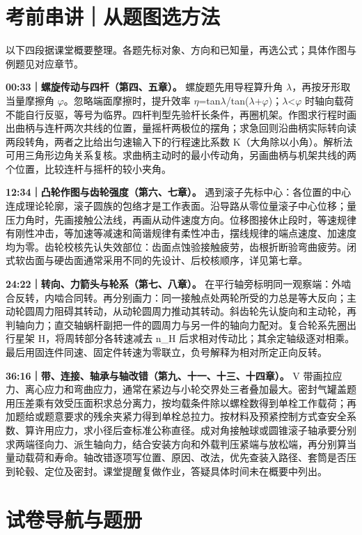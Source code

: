\documentclass[zihao=5,a4paper,UTF8,fontset=fandol]{ctexart}
\begin{document}
\section{考前串讲｜从题图选方法}

以下四段据课堂概要整理。各题先标对象、方向和已知量，再选公式；具体作图与例题见对应章节。


\textbf{00:33｜螺旋传动与四杆（第四、五章）。} 螺旋题先用导程算升角 $\lambda$，再按牙形取当量摩擦角 $\varphi$。忽略端面摩擦时，提升效率 $\eta$=tan$\lambda$/tan($\lambda$+$\varphi$)；$\lambda$<$\varphi$ 时轴向载荷不能自行反驱，等号为临界。四杆判型先验杆长条件，再圈机架。作图求行程时画出曲柄与连杆两次共线的位置，量摇杆两极位的摆角；求急回则沿曲柄实际转向读两段转角，两者之比给出匀速输入下的行程速比系数 K（大角除以小角）。解析法可用三角形边角关系复核。求曲柄主动时的最小传动角，另画曲柄与机架共线的两个位置，比较连杆与摇杆的较小夹角。


\textbf{12:34｜凸轮作图与齿轮强度（第六、七章）。} 遇到滚子先标中心：各位置的中心连成理论轮廓，滚子圆族的包络才是工作表面。沿导路从零位量滚子中心位移；量压力角时，先画接触公法线，再画从动件速度方向。位移图接休止段时，等速规律有刚性冲击，等加速等减速和简谐规律有柔性冲击，摆线规律的端点速度、加速度均为零。齿轮校核先认失效部位：齿面点蚀验接触疲劳，齿根折断验弯曲疲劳。闭式软齿面与硬齿面通常采用不同的先设计、后校核顺序，详见第七章。


\textbf{24:22｜转向、力箭头与轮系（第七、八章）。} 在平行轴旁标明同一观察端：外啮合反转，内啮合同转。再分别画力：同一接触点处两轮所受的力总是等大反向；主动轮圆周力阻碍其转动，从动轮圆周力推动其转动。斜齿轮先认旋向和主动轮，再判轴向力；直交轴蜗杆副把一件的圆周力与另一件的轴向力配对。复合轮系先圈出行星架 H，将周转部分各转速减去 n\_H 后求相对传动比；其余定轴级逐对相乘。最后用固连件同速、固定件转速为零联立，负号解释为相对所定正向反转。


\textbf{36:16｜带、连接、轴承与轴改错（第九、十一、十三、十四章）。} V 带画拉应力、离心应力和弯曲应力，通常在紧边与小轮交界处三者叠加最大。密封气罐盖题用压差乘有效受压面积求总分离力，按均载条件除以螺栓数得到单栓工作载荷；再加题给或题意要求的残余夹紧力得到单栓总拉力。按材料及预紧控制方式查安全系数、算许用应力，求小径后查标准公称直径。成对角接触球或圆锥滚子轴承要分别求两端径向力、派生轴向力，结合安装方向和外载判压紧端与放松端，再分别算当量动载荷和寿命。轴改错逐项写位置、原因、改法，优先查装入路径、套筒是否压到轮毂、定位及密封。课堂提醒复做作业，答疑具体时间未在概要中列出。


\section{试卷导航与题册}
\end{document}
